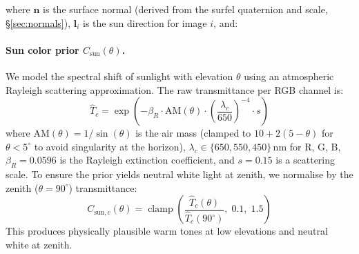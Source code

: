 \noindent where $\mathbf{n}$ is the surface normal (derived from the surfel quaternion and scale, \S\ref{sec:normals}), $\mathbf{l}_i$ is the sun direction for image $i$, and:

\paragraph{Sun color prior $C_{\text{sun}}(\theta)$.}
We model the spectral shift of sunlight with elevation $\theta$ using an atmospheric Rayleigh scattering approximation.
The raw transmittance per RGB channel is:
\begin{equation}
    \hat{T}_c = \exp\!\left(-\beta_R \cdot \text{AM}(\theta) \cdot \left(\frac{\lambda_c}{650}\right)^{-4} \cdot s\right)
    \label{eq:sun_color}
\end{equation}
where $\text{AM}(\theta) = 1/\sin(\theta)$ is the air mass (clamped to $10 + 2(5 - \theta)$ for $\theta < 5^\circ$ to avoid singularity at the horizon), $\lambda_c \in \{650, 550, 450\}$\,nm for R, G, B, $\beta_R = 0.0596$ is the Rayleigh extinction coefficient, and $s = 0.15$ is a scattering scale.
To ensure the prior yields neutral white light at zenith, we normalise by the zenith ($\theta = 90^\circ$) transmittance:
\begin{equation}
    C_{\text{sun},c}(\theta) = \operatorname{clamp}\!\left(\frac{\hat{T}_c(\theta)}{\hat{T}_c(90^\circ)},\; 0.1,\; 1.5\right)
\end{equation}
This produces physically plausible warm tones at low elevations and neutral white at zenith.

